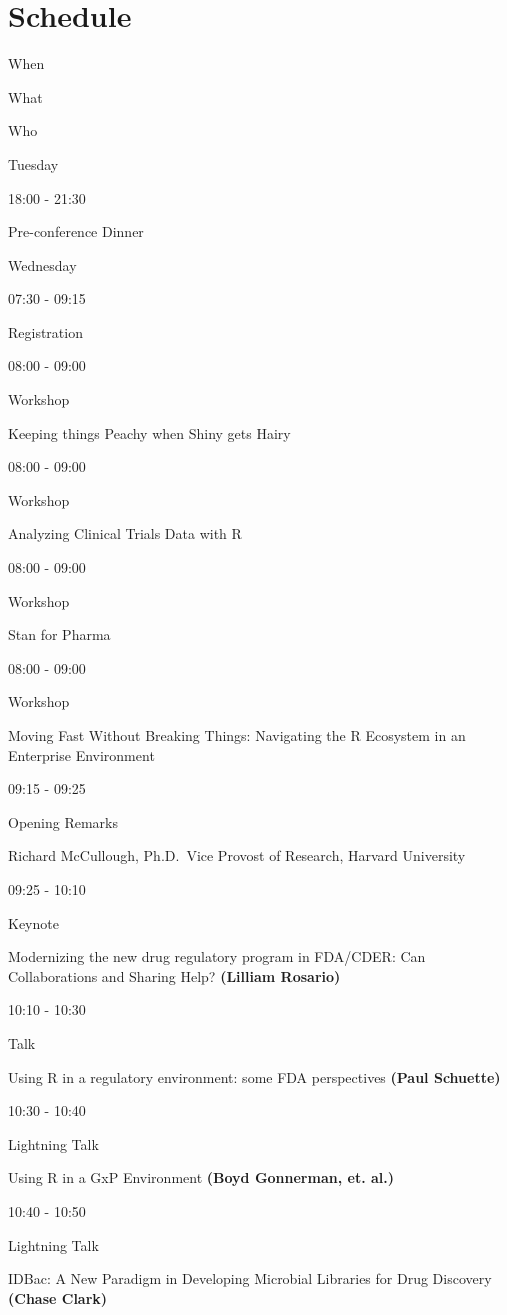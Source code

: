 \documentclass[]{book}
\theoremstyle{definition}
\theoremstyle{definition}
\theoremstyle{definition}
\theoremstyle{remark}
\begin{document}
\hypertarget{schedule}{%
\chapter{Schedule}\label{schedule}}

When

What

Who

Tuesday

18:00 - 21:30

Pre-conference Dinner

Wednesday

07:30 - 09:15

Registration

08:00 - 09:00

Workshop

Keeping things Peachy when Shiny gets Hairy

08:00 - 09:00

Workshop

Analyzing Clinical Trials Data with R

08:00 - 09:00

Workshop

Stan for Pharma

08:00 - 09:00

Workshop

Moving Fast Without Breaking Things: Navigating the R Ecosystem in an
Enterprise Environment

09:15 - 09:25

Opening Remarks

Richard McCullough, Ph.D.~Vice Provost of Research, Harvard University

09:25 - 10:10

Keynote

Modernizing the new drug regulatory program in FDA/CDER: Can
Collaborations and Sharing Help? \textbf{(Lilliam Rosario)}

10:10 - 10:30

Talk

Using R in a regulatory environment: some FDA perspectives \textbf{(Paul
Schuette)}

10:30 - 10:40

Lightning Talk

Using R in a GxP Environment \textbf{(Boyd Gonnerman, et. al.)}

10:40 - 10:50

Lightning Talk

IDBac: A New Paradigm in Developing Microbial Libraries for Drug
Discovery \textbf{(Chase Clark)}
\end{document}
